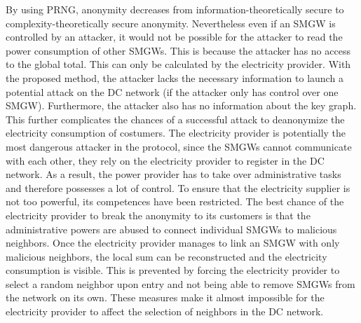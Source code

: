 By using PRNG, anonymity decreases from information-theoretically secure to complexity-theoretically secure anonymity. Nevertheless even if an SMGW is controlled by an attacker, it would not be possible for the attacker to read the power consumption of other SMGWs. This is because the attacker has no access to the global total. This can only be calculated by the electricity provider. With the proposed method, the attacker lacks the necessary information to launch a potential attack on the DC network (if the attacker only has control over one SMGW). Furthermore, the attacker also has no information about the key graph. This further complicates the chances of a successful attack to deanonymize the electricity consumption of costumers. The electricity provider is potentially the most dangerous attacker in the protocol, since the SMGWs cannot communicate with each other, they rely on the electricity provider to register in the DC network. As a result, the power provider has to take over administrative tasks and therefore possesses a lot of control. To ensure that the electricity supplier is not too powerful, its competences have been restricted. The best chance of the electricity provider to break the anonymity to its customers is that the administrative powers are abused to connect individual SMGWs to malicious neighbors. Once the electricity provider manages to link an SMGW with only malicious neighbors, the local sum can be reconstructed and the electricity consumption is visible. This is prevented by forcing the electricity provider to select a random neighbor upon entry and not being able to remove SMGWs from the network on its own. These measures make it almost impossible for the electricity provider to affect the selection of neighbors in the DC network.
\clearpage

